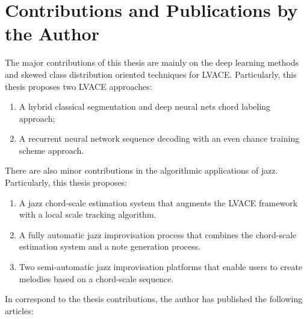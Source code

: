 \section{Contributions and Publications by the Author} \label{sec:1-contribution}
The major contributions of this thesis are mainly on the deep learning methods and skewed class distribution oriented techniques for LVACE. Particularly, this thesis proposes two LVACE approaches:
\begin{enumerate}
\item A hybrid classical segmentation and deep neural nets chord labeling approach;
\item A recurrent neural network sequence decoding with an even chance training scheme approach.
\end{enumerate}
There are also minor contributions in the algorithmic applications of jazz. Particularly, this thesis proposes:
\begin{enumerate}
\item A jazz chord-scale estimation system that augments the LVACE framework with a local scale tracking algorithm.
\item A fully automatic jazz improvisation process that combines the chord-scale estimation system and a note generation process.
\item Two semi-automatic jazz improvisation platforms that enable users to create melodies based on a chord-scale sequence.
\end{enumerate}
\noindent
In correspond to the thesis contributions, the author has published the following articles:
